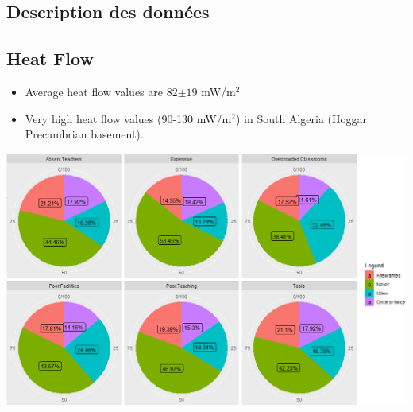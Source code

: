\documentclass[a0, portrait]{a0poster}
\begin{document}
\begin{multicols}{3}
\section*{Description des données}
\subsection*{Heat Flow}
\begin{itemize}
\item Average heat flow values are 82$\pm19$ mW/m$^2$
\item Very high heat flow values (90-130 mW/m$^2$) in South Algeria (Hoggar Precambrian basement).
\end{itemize}
\begin{center}\vspace{1cm}
\end{center}\vspace{1cm}


\begin{center}\vspace{1cm}
\includegraphics[width=0.8\linewidth]{fig_6_pie.png}
\end{center}\vspace{1cm}


\end{multicols}
\end{document}
